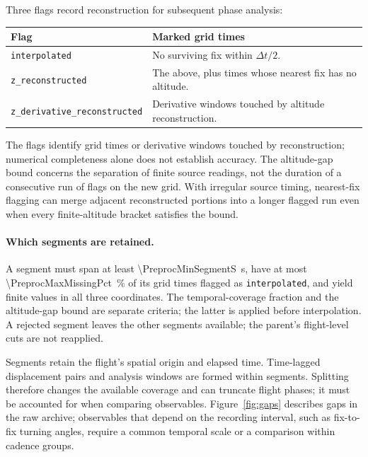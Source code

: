 Three flags record reconstruction for subsequent phase analysis:
\begin{center}
\begin{tabularx}{\linewidth}{@{}l X@{}}
\toprule
\textbf{Flag} & \textbf{Marked grid times} \\
\midrule
\texttt{interpolated} & No surviving fix within $\Delta t/2$. \\
\texttt{z\_reconstructed} & The above, plus times whose nearest fix has no altitude. \\
\texttt{z\_derivative\_reconstructed} & Derivative windows touched by altitude reconstruction. \\
\bottomrule
\end{tabularx}
\end{center}
The flags identify grid times or derivative windows touched by reconstruction;
numerical completeness alone does not establish accuracy. The altitude-gap
bound concerns the separation of finite source readings, not the duration of
a consecutive run of flags on the new grid. With irregular source timing,
nearest-fix flagging can merge adjacent reconstructed portions into a longer
flagged run even when every finite-altitude bracket satisfies the bound.

\paragraph{Which segments are retained.}
A segment must span at least \SI{\PreprocMinSegmentS}{\second}, have at most
\SI{\PreprocMaxMissingPct}{\percent} of its grid times flagged as
\texttt{interpolated}, and yield finite values in all three coordinates.
The temporal-coverage fraction and the altitude-gap bound are separate criteria;
the latter is applied before interpolation.
A rejected segment leaves the other segments available; the parent's flight-level
cuts are not reapplied.

Segments retain the flight's spatial origin and elapsed time. Time-lagged displacement
pairs and analysis windows are formed within segments. Splitting therefore changes the
available coverage and can truncate flight phases; it must be accounted for when
comparing observables. Figure~\ref{fig:gaps} describes gaps in the raw archive;
observables that depend on the recording interval, such as
fix-to-fix turning angles, require a common temporal scale or a comparison within
cadence groups.

